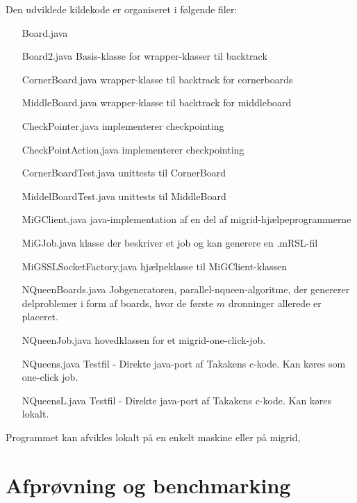 \documentclass[final,a4paper,10pt]{article}
\begin{document}
Den udviklede kildekode er organiseret i følgende filer:
\begin{itemize}
	\item[Board.java] 
	\item[Board2.java] Basis-klasse for wrapper-klasser til backtrack
	\item[CornerBoard.java] wrapper-klasse til backtrack for cornerboards
	\item[MiddleBoard.java] wrapper-klasse til backtrack for middleboard
	\item[CheckPointer.java] implementerer checkpointing
	\item[CheckPointAction.java] implementerer checkpointing
	\item[CornerBoardTest.java] unittests til CornerBoard
	\item[MiddelBoardTest.java] unittests til MiddleBoard
	\item[MiGClient.java] java-implementation af en del af migrid-hjælpeprogrammerne
	\item[MiGJob.java] klasse der beskriver et job og kan generere en .mRSL-fil
	\item[MiGSSLSocketFactory.java] hjælpeklasse til MiGClient-klassen
	\item[NQueenBoards.java] Jobgeneratoren, parallel-nqueen-algoritme, der genererer delproblemer i form af boards, hvor de første $m$ dronninger allerede er placeret. 
	\item[NQueenJob.java] hovedklassen for et migrid-one-click-job. 
	\item[NQueens.java] Testfil - Direkte java-port af Takakens c-kode. Kan køres som one-click job.
	\item[NQueensL.java] Testfil - Direkte java-port af Takakens c-kode. Kan køres lokalt.
\end{itemize}

Programmet kan afvikles lokalt på en enkelt maskine eller på migrid,  



\section{Afprøvning og benchmarking}
\end{document}
